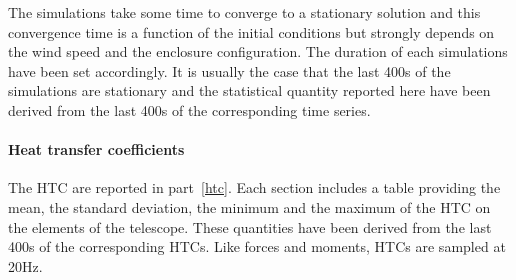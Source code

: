 The simulations take some time to converge to a stationary solution and this convergence time is a function of the initial conditions but strongly depends on the wind speed and the enclosure configuration.
The duration of each simulations have been set accordingly.
It is usually the case that the last 400s of the simulations are stationary and
the statistical quantity reported here have been derived from
the last 400s of the corresponding time series.

\paragraph{Heat transfer coefficients}
The HTC are reported in part~\ref{htc}.
Each section includes a table providing the mean, the standard deviation, the minimum and the
maximum of the HTC  on the elements of the telescope.
These quantities have been derived from the last 400s of the corresponding HTCs.
Like forces and moments, HTCs are sampled at 20Hz.

